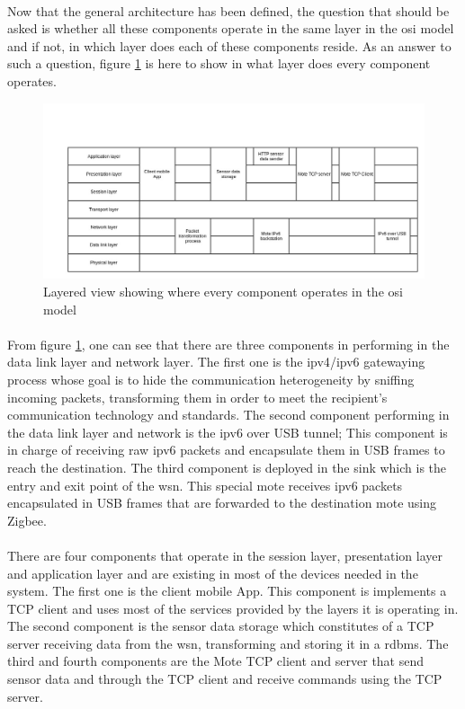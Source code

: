 \documentclass[oneside,12pt,a4paper,final]{book}
\begin{document}
\paragraph{}
Now that the general architecture has been defined, the question that should be asked is whether all these components operate in the same layer in the \gls{osi} model and if not, in which layer does each of these components reside. As an answer to such a question, figure \ref{fig:layered_view} is here to show in what layer does every component operates.

\begin{figure}[htbp]
\centering
\includegraphics[scale=0.40]{img/layered_view.jpg}
\caption{Layered view showing where every component operates in the \gls{osi} model}
\label{fig:layered_view}
\end{figure}

\paragraph{}
From figure \ref{fig:layered_view}, one can see that there are three components in performing in the data link layer and network layer. The first one is the \gls{ipv4}/\gls{ipv6} gatewaying process whose goal is to hide the communication heterogeneity by sniffing incoming packets, transforming them in order to meet the recipient's communication technology and standards. The second component performing in the data link layer and network is the \gls{ipv6} over USB tunnel; This component is in charge of receiving raw \gls{ipv6} packets and encapsulate them in  USB frames to reach the destination. The third component is deployed in the sink which is the entry and exit point of the \gls{wsn}. This special mote receives \gls{ipv6} packets encapsulated in USB frames that are forwarded to the destination mote using Zigbee.

\paragraph{}
There are four components that operate in the session layer, presentation layer and application layer and are existing in most of the devices needed in the system. The first one is the client mobile App. This component is implements a TCP client and uses most of the services provided by the layers it is operating in. The second component is the sensor data storage which constitutes of a TCP server receiving data from the \gls{wsn}, transforming and storing it in a \gls{rdbms}. The third and fourth components are the Mote TCP client and server that send sensor data and through the TCP client and receive commands using the TCP server. 
\end{document}
